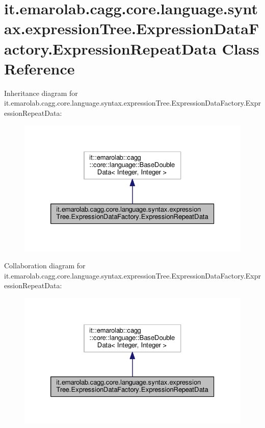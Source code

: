 \hypertarget{classit_1_1emarolab_1_1cagg_1_1core_1_1language_1_1syntax_1_1expressionTree_1_1ExpressionDataFactory_1_1ExpressionRepeatData}{\section{it.\-emarolab.\-cagg.\-core.\-language.\-syntax.\-expression\-Tree.\-Expression\-Data\-Factory.\-Expression\-Repeat\-Data Class Reference}
\label{classit_1_1emarolab_1_1cagg_1_1core_1_1language_1_1syntax_1_1expressionTree_1_1ExpressionDataFactory_1_1ExpressionRepeatData}
}


Inheritance diagram for it.\-emarolab.\-cagg.\-core.\-language.\-syntax.\-expression\-Tree.\-Expression\-Data\-Factory.\-Expression\-Repeat\-Data\-:\nopagebreak
\begin{figure}[H]
\begin{center}
\leavevmode
\includegraphics[width=326pt]{classit_1_1emarolab_1_1cagg_1_1core_1_1language_1_1syntax_1_1expressionTree_1_1ExpressionDataFacd80cb9460474237360ef8d3ec1f37e72}
\end{center}
\end{figure}


Collaboration diagram for it.\-emarolab.\-cagg.\-core.\-language.\-syntax.\-expression\-Tree.\-Expression\-Data\-Factory.\-Expression\-Repeat\-Data\-:\nopagebreak
\begin{figure}[H]
\begin{center}
\leavevmode
\includegraphics[width=326pt]{classit_1_1emarolab_1_1cagg_1_1core_1_1language_1_1syntax_1_1expressionTree_1_1ExpressionDataFac615049d4dafc5bf19a0972edfec070e1}
\end{center}
\end{figure}
